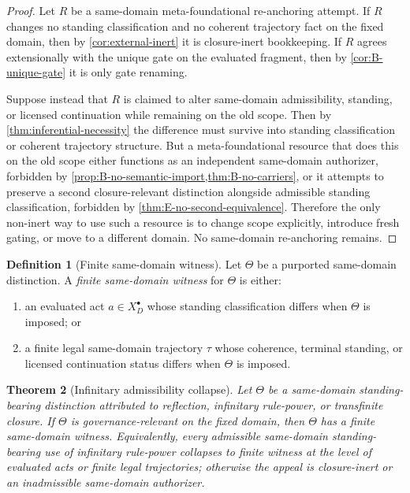 \documentclass[11pt]{article}
\theoremstyle{plain}
\newtheorem{theorem}{Theorem}[section]
\theoremstyle{definition}
\newtheorem{definition}[theorem]{Definition}
\newcommand{\domain}{D}
\begin{document}
\begin{proof}
Let $R$ be a same-domain meta-foundational re-anchoring attempt. If $R$ changes no standing classification and no coherent trajectory fact on the fixed domain, then by \cref{cor:external-inert} it is closure-inert bookkeeping. If $R$ agrees extensionally with the unique gate on the evaluated fragment, then by \cref{cor:B-unique-gate} it is only gate renaming.

Suppose instead that $R$ is claimed to alter same-domain admissibility, standing, or licensed continuation while remaining on the old scope. Then by \cref{thm:inferential-necessity} the difference must survive into standing classification or coherent trajectory structure. But a meta-foundational resource that does this on the old scope either functions as an independent same-domain authorizer, forbidden by \cref{prop:B-no-semantic-import,thm:B-no-carriers}, or it attempts to preserve a second closure-relevant distinction alongside admissible standing classification, forbidden by \cref{thm:E-no-second-equivalence}. Therefore the only non-inert way to use such a resource is to change scope explicitly, introduce fresh gating, or move to a different domain. No same-domain re-anchoring remains.
\end{proof}

\begin{definition}[Finite same-domain witness]
Let $\Theta$ be a purported same-domain distinction. A \emph{finite same-domain witness} for $\Theta$ is either:
\begin{enumerate}[label=(\roman*), leftmargin=2.5em]
    \item an evaluated act $a\in X^\bullet_\domain$ whose standing classification differs when $\Theta$ is imposed; or
    \item a finite legal same-domain trajectory $\tau$ whose coherence, terminal standing, or licensed continuation status differs when $\Theta$ is imposed.
\end{enumerate}
\end{definition}

\begin{theorem}[Infinitary admissibility collapse]
\label{thm:infinitary-collapse}
Let $\Theta$ be a same-domain standing-bearing distinction attributed to reflection, infinitary rule-power, or transfinite closure. If $\Theta$ is governance-relevant on the fixed domain, then $\Theta$ has a finite same-domain witness. Equivalently, every admissible same-domain standing-bearing use of infinitary rule-power collapses to finite witness at the level of evaluated acts or finite legal trajectories; otherwise the appeal is closure-inert or an inadmissible same-domain authorizer.
\end{theorem}
\end{document}
